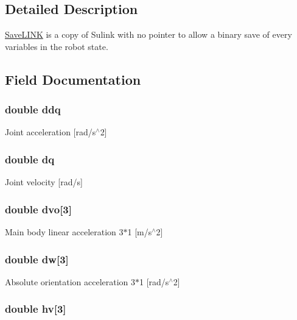 \subsection{Detailed Description}
\hyperlink{struct_save_l_i_n_k}{Save\-L\-I\-N\-K} is a copy of Sulink with no pointer to allow a binary save of every variables in the robot state. 

\subsection{Field Documentation}
\hypertarget{struct_save_l_i_n_k_a63253863f0cf910e3b007c37de0e5ffd}{
\subsubsection[{ddq}]{\setlength{\rightskip}{0pt plus 5cm}double ddq}}\label{struct_save_l_i_n_k_a63253863f0cf910e3b007c37de0e5ffd}
Joint acceleration \mbox{[}rad/s$^\wedge$2\mbox{]} \hypertarget{struct_save_l_i_n_k_a7f417372d0026193269f02c43323b5b8}{
\subsubsection[{dq}]{\setlength{\rightskip}{0pt plus 5cm}double dq}}\label{struct_save_l_i_n_k_a7f417372d0026193269f02c43323b5b8}
Joint velocity \mbox{[}rad/s\mbox{]} \hypertarget{struct_save_l_i_n_k_ad8cc15fc2d39656586d8ffa72dd2fa97}{
\subsubsection[{dvo}]{\setlength{\rightskip}{0pt plus 5cm}double dvo\mbox{[}3\mbox{]}}}\label{struct_save_l_i_n_k_ad8cc15fc2d39656586d8ffa72dd2fa97}
Main body linear acceleration 3$\ast$1 \mbox{[}m/s$^\wedge$2\mbox{]} \hypertarget{struct_save_l_i_n_k_a9a93721b064a040498b5c08cd6ed014b}{
\subsubsection[{dw}]{\setlength{\rightskip}{0pt plus 5cm}double dw\mbox{[}3\mbox{]}}}\label{struct_save_l_i_n_k_a9a93721b064a040498b5c08cd6ed014b}
Absolute orientation acceleration 3$\ast$1 \mbox{[}rad/s$^\wedge$2\mbox{]} \hypertarget{struct_save_l_i_n_k_a5b6e47bde4ca802c5f52ba814b4b3c1f}{
\subsubsection[{hv}]{\setlength{\rightskip}{0pt plus 5cm}double hv\mbox{[}3\mbox{]}}}\label{struct_save_l_i_n_k_a5b6e47bde4ca802c5f52ba814b4b3c1f}
